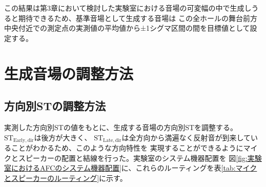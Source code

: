 \documentclass[11pt,a4j]{jreport}
\begin{document}
    この結果は第3章において検討した実験室における音場の可変幅の中で生成しうると期待できるため、基準音場として生成する音場は
    この全ホールの舞台前方中央付近での測定点の実測値の平均値から±1シグマ区間の間を目標値として設定する。
    


  \section{生成音場の調整方法}
    
    \subsection{方向別STの調整方法}
    実測した方向別STの値をもとに、生成する音場の方向別STを調整する。$\mathrm{ST_{Early,dir}}$は後方が大きく、
    $\mathrm{ST_{Late,dir}}$は全方向から満遍なく反射音が到来していることがわかるため、このような方向特性を
    実現することができるようにマイクとスピーカーの配置と結線を行った。実験室のシステム機器配置を
    図\ref{fig:実験室におけるAFCのシステム機器配置}に、これらのルーティングを表\ref{tab:マイクとスピーカーのルーティング}に示す。
\end{document}

